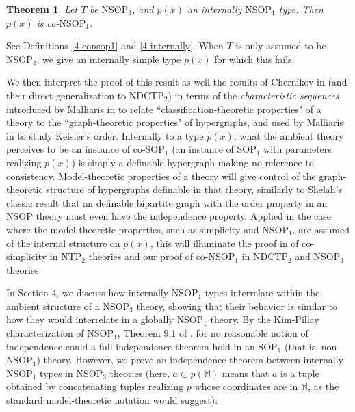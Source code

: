 \documentclass[12pt]{amsart}
\newtheorem{theorem}{Theorem}[section]
\theoremstyle{definition}
\begin{document}
\begin{theorem}\label{4-main0}
    Let $T$ be $\mathrm{NSOP}_{3}$, and $p(x)$ an internally $\mathrm{NSOP}_{1}$ type. Then $p(x)$ is co-$\mathrm{NSOP}_{1}$.
\end{theorem}


See Definitions \ref{4-consop1} and \ref{4-internally}. When $T$ is only assumed to be $\mathrm{NSOP}_{4}$, we give an internally simple type $p(x)$ for which this fails.

We then interpret the proof of this result as well the results of Chernikov in \cite{Che14} (and their direct generalization to $\mathrm{NDCTP}_{2}$) in terms of the \textit{characteristic sequences} introduced by Malliaris in \cite{Mal10} to relate ``classification-theoretic properties" of a theory to the ``graph-theoretic properties" of hypergraphs, and used by Malliaris in \cite{Mal12} to study Keisler's order. Internally to a type $p(x)$, what the ambient theory perceives to be an instance of co-$\mathrm{SOP}_{1}$ (an instance of $\mathrm{SOP}_{1}$ with parameters realizing $p(x)$) is simply a definable hypergraph making no reference to consistency. Model-theoretic properties of a theory will give control of the graph-theoretic structure of hypergraphs definable in that theory, similarly to Shelah's classic result that an definable bipartite graph with the order property in an $\mathrm{NSOP}$ theory must even have the independence property. Applied in the case where the model-theoretic properties, such as simplicity and $\mathrm{NSOP}_{1}$, are assumed of the internal structure on $p(x)$, this will illuminate the proof in \cite{Che14} of co-simplicity in $\mathrm{NTP}_{2}$ theories and our proof of co-$\mathrm{NSOP}_{1}$ in $\mathrm{NDCTP}_{2}$ and $\mathrm{NSOP}_{3}$ theories.

In Section 4, we discuss how internally $\mathrm{NSOP}_{1}$ types interrelate within the ambient structure of a $\mathrm{NSOP}_{3}$ theory, showing that their behavior is similar to how they would interrelate in a globally $\mathrm{NSOP}_{1}$ theory. By the Kim-Pillay characterization of $\mathrm{NSOP}_{1}$, Theorem 9.1 of \cite{KR17}, for no reasonable notion of independence could a full independence theorem hold in an $\mathrm{SOP}_{1}$ (that is, non-$\mathrm{NSOP}_{1}$) theory. However, we prove an independence theorem between internally $\mathrm{NSOP}_{1}$ types in $\mathrm{NSOP}_{3}$ theories (here, $a \subset p(\mathbb{M})$ means that $a$ is a tuple obtained by concatenating tuples realizing $p$ whose coordinates are in $\mathbb{M}$, as the standard model-theoretic notation would suggest):
\end{document}
